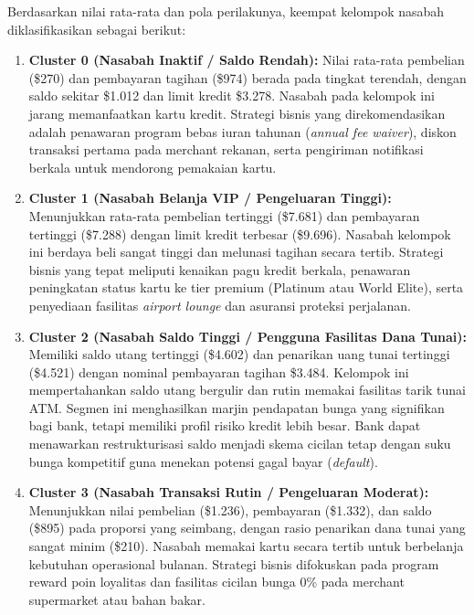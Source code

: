 \documentclass[a4paper,oneside,12pt]{report}
\begin{document}
Berdasarkan nilai rata-rata dan pola perilakunya, keempat kelompok nasabah diklasifikasikan sebagai berikut:
\begin{enumerate}[noitemsep, topsep=1pt, parsep=0.5pt, partopsep=0pt]
    \item \textbf{Cluster 0 (Nasabah Inaktif / Saldo Rendah):} Nilai rata-rata pembelian (\$270) dan pembayaran tagihan (\$974) berada pada tingkat terendah, dengan saldo sekitar \$1.012 dan limit kredit \$3.278. Nasabah pada kelompok ini jarang memanfaatkan kartu kredit. Strategi bisnis yang direkomendasikan adalah penawaran program bebas iuran tahunan (\textit{annual fee waiver}), diskon transaksi pertama pada merchant rekanan, serta pengiriman notifikasi berkala untuk mendorong pemakaian kartu.
    \item \textbf{Cluster 1 (Nasabah Belanja VIP / Pengeluaran Tinggi):} Menunjukkan rata-rata pembelian tertinggi (\$7.681) dan pembayaran tertinggi (\$7.288) dengan limit kredit terbesar (\$9.696). Nasabah kelompok ini berdaya beli sangat tinggi dan melunasi tagihan secara tertib. Strategi bisnis yang tepat meliputi kenaikan pagu kredit berkala, penawaran peningkatan status kartu ke tier premium (Platinum atau World Elite), serta penyediaan fasilitas \textit{airport lounge} dan asuransi proteksi perjalanan.
    \item \textbf{Cluster 2 (Nasabah Saldo Tinggi / Pengguna Fasilitas Dana Tunai):} Memiliki saldo utang tertinggi (\$4.602) dan penarikan uang tunai tertinggi (\$4.521) dengan nominal pembayaran tagihan \$3.484. Kelompok ini mempertahankan saldo utang bergulir dan rutin memakai fasilitas tarik tunai ATM. Segmen ini menghasilkan marjin pendapatan bunga yang signifikan bagi bank, tetapi memiliki profil risiko kredit lebih besar. Bank dapat menawarkan restrukturisasi saldo menjadi skema cicilan tetap dengan suku bunga kompetitif guna menekan potensi gagal bayar (\textit{default}).
    \item \textbf{Cluster 3 (Nasabah Transaksi Rutin / Pengeluaran Moderat):} Menunjukkan nilai pembelian (\$1.236), pembayaran (\$1.332), dan saldo (\$895) pada proporsi yang seimbang, dengan rasio penarikan dana tunai yang sangat minim (\$210). Nasabah memakai kartu secara tertib untuk berbelanja kebutuhan operasional bulanan. Strategi bisnis difokuskan pada program reward poin loyalitas dan fasilitas cicilan bunga 0\% pada merchant supermarket atau bahan bakar.
\end{enumerate}


\clearpage
\end{document}
